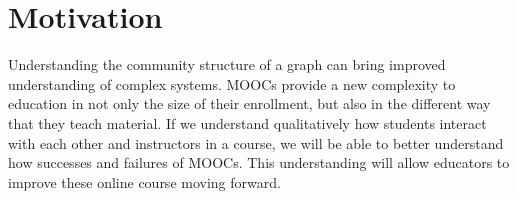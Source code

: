 \section{Motivation} 
Understanding the community structure of a graph can bring improved understanding of complex systems. MOOCs provide a new complexity to education in not only the size of their enrollment, but also in the different way that they teach material. If we understand qualitatively how students interact with each other and instructors in a course, we will be able to better understand how successes and failures of MOOCs. This understanding will allow educators to improve these online course moving forward.